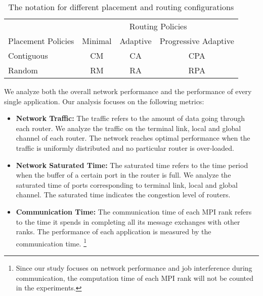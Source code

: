 
\begin{table}[ht]
\begin{center}
\caption{The notation for different placement and routing configurations} 
\label{tab: placement routing configs}
\begin{tabular}{l c c c }
\toprule %
\toprule
&\multicolumn{3}{c}{Routing Policies} \\ 
\cmidrule(l){2-4}
Placement Policies & Minimal & Adaptive & Progressive Adaptive\\ %
\midrule %
Contiguous  &  CM   &   CA   &  CPA   \\ %
\midrule
Random  &   RM  &   RA   &  RPA   \\ 
\midrule %
\bottomrule %
\end{tabular}
\end{center}
\end{table}


We analyze both the overall network performance and the performance of every single application.
Our analysis focuses on the following metrics:
\begin{itemize}

    \item \textbf{Network Traffic:} The traffic refers to the amount of data going through each router. We analyze the traffic on the terminal link, local and global channel of each router. The network reaches optimal performance when the traffic is uniformly distributed and no particular router is over-loaded. 
            
    \item \textbf{Network Saturated Time:} The saturated time refers to the time period when the buffer of a certain port in the router is full. We analyze the saturated time of ports corresponding to terminal link, local and global channel. The saturated time indicates the congestion level of routers. 
    
    \item \textbf{Communication Time:} The communication time of each MPI rank refers to the time it spends in completing all its message exchanges with other ranks. The performance of each application is measured by the communication time.  
\footnote{Since our study focuses on network performance and job interference during communication, the computation time of each MPI rank will not be counted in the experiments.
}

\end{itemize}



